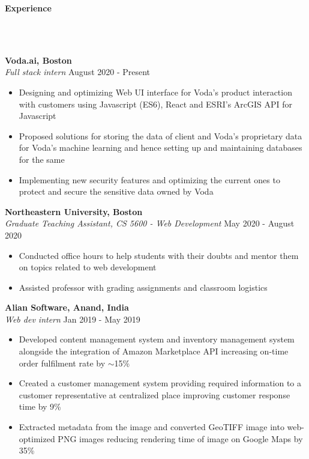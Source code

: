 \documentclass[]{article}
\newcommand{\lineunder} {
    \vspace*{-8pt} \\
    \hrulefill \\
}
\newcommand{\header} [1] {
    {\vspace*{6pt} \fontsize{12}{12}\selectfont \textbf{#1}}
     \lineunder
}
\begin{document}
\header{Experience}
\vspace{1mm}

\hspace{1mm}
\textbf{Voda.ai, Boston}\\
\hspace{1mm}
\textit{Full stack intern} \hfill August 2020 - Present\\
\vspace{-3mm}
\begin{itemize}
    \setlength\itemsep{-1mm}
    \item Designing and optimizing Web UI interface for Voda's product interaction with customers using Javascript (ES6), React and ESRI's ArcGIS API for Javascript
    \item Proposed solutions for storing the data of client and Voda's proprietary data for Voda's machine learning and hence setting up and maintaining databases for the same
    \item Implementing new security features and optimizing the current ones to protect and secure the sensitive data owned by Voda
\end{itemize}
\vspace{-2mm}

\hspace{1mm}
\textbf{Northeastern University, Boston}\\
\hspace{1mm}
\textit{Graduate Teaching Assistant, CS 5600 - Web Development} \hfill May 2020 - August 2020\\
\vspace{-3mm}
\begin{itemize}
    \setlength\itemsep{-1mm}
    \item Conducted office hours to help students with their doubts and mentor them on topics related to web development
    \item Assisted professor with grading assignments and classroom logistics  
\end{itemize}
\vspace{-2mm}
\hspace{1mm}
\textbf{Alian Software, Anand, India}\\
\hspace{1mm}
\textit{Web dev intern} \hfill Jan 2019 - May 2019\\
\vspace{-3mm}
\begin{itemize}
    \setlength\itemsep{-1mm}
    \item Developed content management system and inventory management system alongside the integration of Amazon Marketplace API increasing on-time order fulfilment rate by $\sim$15\%
	\item Created a customer management system providing required information to a customer representative at centralized place improving customer response time by 9\%
	\item Extracted metadata from the image and converted GeoTIFF image into web-optimized PNG images reducing rendering time of image on Google Maps by 35\%
\end{itemize}
\end{document}
